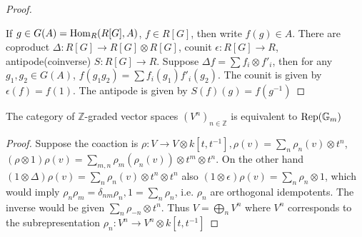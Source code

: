 \documentclass[main]{subfiles}
\begin{document}
\begin{proof}
\begin{center}
\end{center}
\begin{center}
\end{center}

If $g\in G(A)=\operatorname{Hom}_R(R[G],A)$, $f\in R[G]$, then write $f(g)\in A$. There are coproduct $\Delta:R[G]\to R[G]\otimes R[G]$, counit $\epsilon:R[G]\to R$, antipode(coinverse) $S:R[G]\to R$. Suppose $\Delta f=\sum f_i\otimes f'_i$, then for any $g_1,g_2\in G(A)$, $f(g_1g_2)=\sum f_i(g_1)f'_i(g_2)$. The counit is given by $\epsilon(f)=f(1)$. The antipode is given by $S(f)(g)=f(g^{-1})$
\end{proof}

\begin{example}
The category of $\mathbb Z$-graded vector spaces $(V^n)_{n\in\mathbb Z}$ is equivalent to $\operatorname{Rep}(\mathbb G_m)$
\end{example}

\begin{proof}
Suppose the coaction is $\rho:V\to V\otimes k[t,t^{-1}],\rho(v)=\sum_{n}\rho_n(v)\otimes t^n$, $(\rho\otimes 1)\rho(v)=\sum_{m,n}\rho_m(\rho_n(v))\otimes t^m\otimes t^n$. On the other hand $(1\otimes\Delta)\rho(v)=\sum_{n}\rho_n(v)\otimes t^n\otimes t^n$ also $(1\otimes\epsilon)\rho(v)=\sum_n\rho_n\otimes1$, which would imply $\rho_n\rho_m=\delta_{nm}\rho_n,1=\sum_n\rho_n$, i.e. $\rho_n$ are orthogonal idempotents. The inverse would be given $\sum_n\rho_{-n}\otimes t^n$. Thus $V=\bigoplus_nV^n$ where $V^n$ corresponds to the subrepresentation $\rho_n:V^n\to V^n\otimes k[t,t^{-1}]$
\end{proof}
\end{document}
